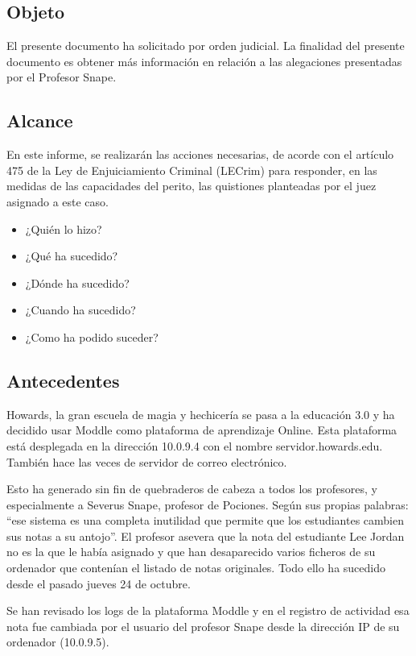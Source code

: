 \subsection{Objeto}

El presente documento ha solicitado por orden judicial.
La finalidad del presente documento es obtener más información en relación a las alegaciones presentadas por el Profesor Snape.

\subsection{Alcance}

En este informe, se realizarán las acciones necesarias, de acorde con el artículo 475 de la Ley de Enjuiciamiento Criminal (LECrim) para responder, en las medidas de las capacidades del perito, las quistiones planteadas por el juez asignado a este caso. 

\begin{itemize}
\item{¿Quién lo hizo?}
\item{¿Qué ha sucedido?}
\item{¿Dónde ha sucedido?}
\item{¿Cuando ha sucedido?}
\item{¿Como ha podido suceder?}
\end{itemize}


\subsection{Antecedentes}

Howards, la gran escuela de magia y hechicería se pasa a la educación 3.0 y ha decidido usar
Moddle como plataforma de aprendizaje Online. Esta plataforma está desplegada en la dirección
10.0.9.4 con el nombre servidor.howards.edu. También hace las veces de servidor de correo
electrónico.\par
Esto ha generado sin fin de quebraderos de cabeza a todos los profesores, y especialmente a
Severus Snape, profesor de Pociones. Según sus propias palabras: “ese sistema es una completa
inutilidad que permite que los estudiantes cambien sus notas a su antojo”. El profesor asevera 
que la nota del estudiante Lee Jordan no es la que le había asignado y que han desaparecido
varios ficheros de su ordenador que contenían el listado de notas originales. Todo ello ha
sucedido desde el pasado jueves 24 de octubre.\par
Se han revisado los logs de la plataforma Moddle y en el registro de actividad esa nota fue
cambiada por el usuario del profesor Snape desde la dirección \gls{IP} de su ordenador (10.0.9.5).

